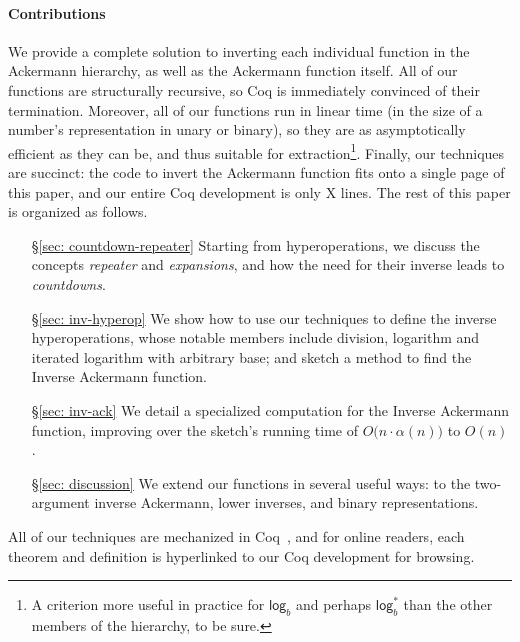 \paragraph{Contributions}
We provide a complete solution to inverting each individual function in the Ackermann hierarchy,
as well as the Ackermann function itself.  All of our functions are structurally recursive, so
Coq is immediately convinced of their termination.  Moreover, all of our functions run in linear
time (in the size of a number's representation in unary or binary), so they are as asymptotically efficient as they can be, and thus suitable for extraction\footnote{A criterion more useful in practice for $\mathsf{log}_b$ and perhaps $\mathsf{log}^*_b$ than the other members of the hierarchy, to be sure.}.  Finally, our techniques are succinct: the code to invert the Ackermann function fits onto a single page of this paper, and our entire Coq development is only {\color{red} X} lines. The rest of this paper is organized as follows.
\begin{itemize}
	\item[\S\ref{sec: countdown-repeater}] Starting from hyperoperations, we discuss the concepts \emph{repeater} and \emph{expansions}, and how the need for their inverse leads to \emph{countdowns}.
	\item[\S\ref{sec: inv-hyperop}] We show how to use our techniques to define the inverse hyperoperations, whose notable members include division, logarithm and iterated logarithm with arbitrary base; and sketch a method to find the Inverse Ackermann function.
	\item[\S\ref{sec: inv-ack}] We detail a specialized computation for the Inverse Ackermann function, improving over the sketch's running time of $O\big(n \cdot \alpha(n)\big)$ to $O(n)$.
	\item[\S\ref{sec: discussion}] We extend our functions in several useful ways: to the two-argument inverse Ackermann, lower inverses, and binary representations.
\end{itemize}
All of our techniques are mechanized in Coq~\cite{blah}, and for online readers, 
each theorem and definition is hyperlinked to our Coq development for browsing.

